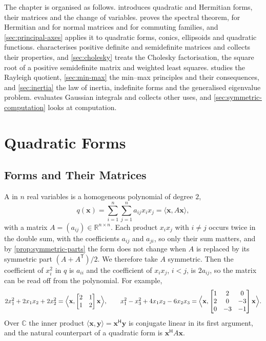 The chapter is organised as follows.  introduces quadratic and Hermitian forms, their matrices and the change of variables.  proves the spectral theorem, for Hermitian and for normal matrices and for commuting families, and \cref{sec:principal-axes} applies it to quadratic forms, conics, ellipsoids and quadratic functions.  characterises positive definite and semidefinite matrices and collects their properties, and \cref{sec:cholesky} treats the Cholesky factorisation, the square root of a positive semidefinite matrix and weighted least squares.  studies the Rayleigh quotient, \cref{sec:min-max} the min--max principles and their consequences, and \cref{sec:inertia} the law of inertia, indefinite forms and the generalised eigenvalue problem.  evaluates Gaussian integrals and collects other uses, and \cref{sec:symmetric-computation} looks at computation.

\section{Quadratic Forms}
\label{sec:quadratic-forms}

\subsection{Forms and Their Matrices}

A  in $n$ real variables is a homogeneous polynomial of degree $2$,
\[
q(\mathbf x)=\sum_{i=1}^n\sum_{j=1}^na_{ij}x_ix_j=\langle\mathbf x,A\mathbf x\rangle ,
\]
with a matrix $A=(a_{ij})\in\mathbb R^{n\times n}$. Each product $x_ix_j$ with $i\ne j$ occurs twice in the double sum, with the coefficients $a_{ij}$ and $a_{ji}$, so only their sum matters, and by \cref{prop:symmetric-parts} the form does not change when $A$ is replaced by its symmetric part $(A+A^{\mathsf T})/2$. We therefore take $A$ symmetric. Then the coefficient of $x_i^2$ in $q$ is $a_{ii}$ and the coefficient of $x_ix_j$, $i<j$, is $2a_{ij}$, so the matrix can be read off from the polynomial. For example,
\[
2x_1^2+2x_1x_2+2x_2^2=\Bigl\langle\mathbf x,\begin{bmatrix}2&1\\1&2\end{bmatrix}\mathbf x\Bigr\rangle,\qquad x_1^2-x_3^2+4x_1x_2-6x_2x_3=\Bigl\langle\mathbf x,\begin{bmatrix}1&2&0\\2&0&-3\\0&-3&-1\end{bmatrix}\mathbf x\Bigr\rangle .
\]
Over $\mathbb C$ the inner product $\langle\mathbf x,\mathbf y\rangle=\mathbf x^{\mathsf H}\mathbf y$ is conjugate linear in its first argument, and the natural counterpart of a quadratic form is $\mathbf x^{\mathsf H}A\mathbf x$.

